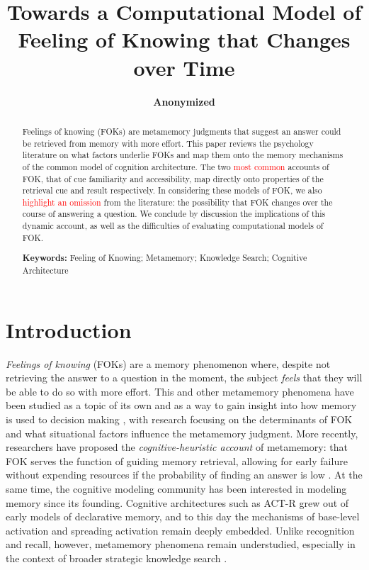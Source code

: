 \documentclass[10pt,letterpaper]{article}
\title{Towards a Computational Model of Feeling of Knowing that Changes over Time} %
\author{
    {\large \bf Anonymized}
}
\newcommand{\fixme}[2][]{#2}
\renewcommand{\fixme}[2][]{\textcolor{red}{#2}}
\begin{document}
\maketitle

\begin{abstract}

    Feelings of knowing (FOKs) are metamemory judgments that suggest an answer could be retrieved from memory with more effort.
    This paper reviews the psychology literature on what factors underlie FOKs and map them onto the memory mechanisms of the common model of cognition architecture.
    The two \fixme{most common} accounts of FOK, that of cue familiarity and accessibility, map directly onto properties of the retrieval cue and result respectively.
    In considering these models of FOK, we also \fixme{highlight} \fixme{an omission} from the literature: the possibility that FOK changes over the course of answering a question.
    We conclude by discussion the implications of this dynamic account, as well as the difficulties of evaluating computational models of FOK.

    \textbf{Keywords:} Feeling of Knowing; Metamemory; Knowledge Search; Cognitive Architecture

\end{abstract}


\section{Introduction}

\textit{Feelings of knowing} (FOKs) are a memory phenomenon where, despite not retrieving the answer to a question in the moment, the subject \textit{feels} that they will be able to do so with more effort.
This and other metamemory phenomena have been studied as a topic of its own and as a way to gain insight into how memory is used to decision making \cite{Nelson1994WhyInvestigateMetacognition}, with research focusing on the determinants of FOK and what situational factors influence the metamemory judgment.
More recently, researchers have proposed the \textit{cognitive-heuristic account} of metamemory: that FOK serves the function of guiding memory retrieval, allowing for early failure without expending resources if the probability of finding an answer is low \cite{Schwartz2011TipOfThe}.
At the same time, the cognitive modeling community has been interested in modeling memory since its founding.
Cognitive architectures such as ACT-R \cite{Anderson2007HowCanThe} grew out of early models of declarative memory, and to this day the mechanisms of base-level activation and spreading activation remain deeply embedded.
Unlike recognition and recall, however, metamemory phenomena remain understudied, especially in the context of broader strategic knowledge search \cite{Newell1972HumanProblemSolving}.
\end{document}
